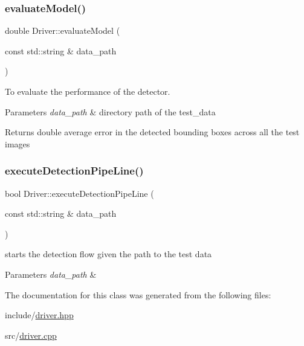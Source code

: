 \subsubsection{\texorpdfstring{evaluate\+Model()}{evaluateModel()}}
{\footnotesize\ttfamily double Driver\+::evaluate\+Model (\begin{DoxyParamCaption}\item[{const std\+::string \&}]{data\+\_\+path }\end{DoxyParamCaption})}



To evaluate the performance of the detector. 


\begin{DoxyParams}{Parameters}
{\em data\+\_\+path} & directory path of the test\+\_\+data \\
\hline
\end{DoxyParams}
\begin{DoxyReturn}{Returns}
double average error in the detected bounding boxes across all the test images 
\end{DoxyReturn}
\mbox{\label{classDriver_ae57ca27b933b3522aca744205a8a2169}} 
\subsubsection{\texorpdfstring{execute\+Detection\+Pipe\+Line()}{executeDetectionPipeLine()}}
{\footnotesize\ttfamily bool Driver\+::execute\+Detection\+Pipe\+Line (\begin{DoxyParamCaption}\item[{const std\+::string \&}]{data\+\_\+path }\end{DoxyParamCaption})}



starts the detection flow given the path to the test data 


\begin{DoxyParams}{Parameters}
{\em data\+\_\+path} & \\
\hline
\end{DoxyParams}


The documentation for this class was generated from the following files\+:\begin{DoxyCompactItemize}
\item 
include/\hyperlink{driver_8hpp}{driver.\+hpp}\item 
src/\hyperlink{driver_8cpp}{driver.\+cpp}\end{DoxyCompactItemize}
